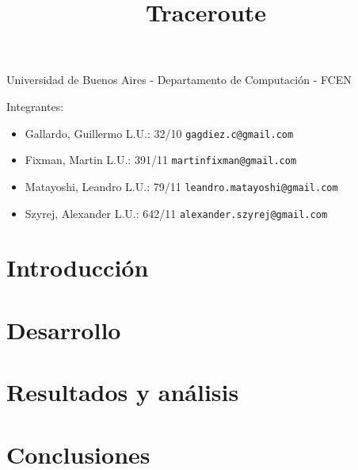 \documentclass[a4paper,11pt]{article}
\title{Traceroute}
\begin{document}
\maketitle

\begin{center}
	Universidad de Buenos Aires - Departamento de Computaci\'on - FCEN
\end{center}

\vspace{2cm}
Integrantes:

\begin{itemize}
	\item Gallardo, Guillermo L.U.: 32/10 \verb+gagdiez.c@gmail.com+
	\item Fixman, Martin L.U.: 391/11 \verb+martinfixman@gmail.com+
	\item Matayoshi, Leandro L.U.: 79/11 \verb+leandro.matayoshi@gmail.com+
	\item Szyrej, Alexander L.U.: 642/11 \verb+alexander.szyrej@gmail.com+
		
\end{itemize}

\newpage

\tableofcontents

\newpage

\section{Introducción}



\section{Desarrollo}



\clearpage

\section{Resultados y análisis}



\section{Conclusiones}

%
\end{document}
